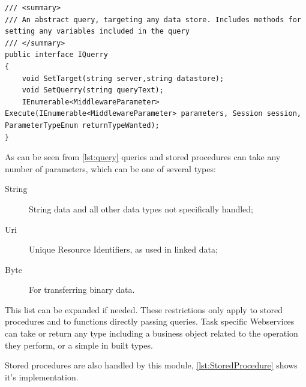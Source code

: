 \begin{lstlisting}[language={[Sharp]C},frame=tb,caption={The IQuery interface, which must be implemented by all executable queries},label=lst:query]
/// <summary>
/// An abstract query, targeting any data store. Includes methods for setting any variables included in the query
/// </summary>
public interface IQuerry
{
    void SetTarget(string server,string datastore);
    void SetQuerry(string queryText);
    IEnumerable<MiddlewareParameter> Execute(IEnumerable<MiddlewareParameter> parameters, Session session, ParameterTypeEnum returnTypeWanted);      
}
\end{lstlisting}

As can be seen from \autoref{lst:query} queries and stored procedures can take any number of parameters, which can be one of several types:

\begin{description}
    \item[String] String data and all other data types not specifically handled;
    \item[Uri]  Unique Resource Identifiers, as used in linked data;
    \item[Byte] For transferring binary data.
\end{description}

This list can be expanded if needed. These restrictions only apply to stored procedures and to functions directly passing queries. Task specific Webservices can take or return any type including a business object related to the operation they perform, or a simple in built types.

Stored procedures are also handled by this module, \autoref{lst:StoredProcedure} shows it's implementation.

